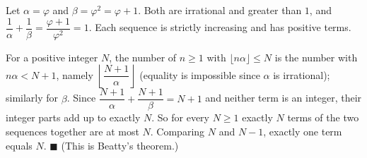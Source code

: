Let $\alpha=\varphi$ and $\beta=\varphi^2=\varphi+1$. Both are irrational and greater than $1$, and $\dfrac1\alpha+\dfrac1\beta=\dfrac{\varphi+1}{\varphi^2}=1$. Each sequence is strictly increasing and has positive terms.

For a positive integer $N$, the number of $n\ge1$ with $\lfloor n\alpha\rfloor\le N$ is the number with $n\alpha<N+1$, namely $\left\lfloor\dfrac{N+1}{\alpha}\right\rfloor$ (equality is impossible since $\alpha$ is irrational); similarly for $\beta$. Since $\dfrac{N+1}{\alpha}+\dfrac{N+1}{\beta}=N+1$ and neither term is an integer, their integer parts add up to exactly $N$. So for every $N\ge1$ exactly $N$ terms of the two sequences together are at most $N$. Comparing $N$ and $N-1$, exactly one term equals $N$. $\blacksquare$ (This is Beatty's theorem.)
